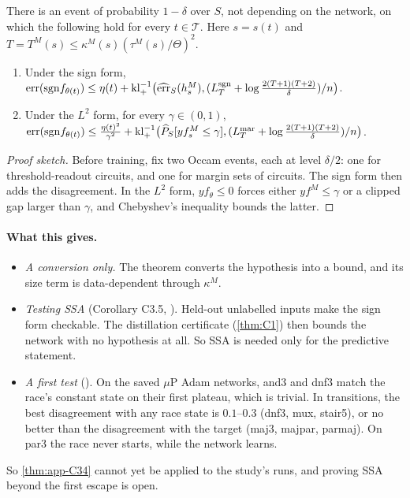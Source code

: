 \begin{theorem}\label{thm:app-C34}
\quad There is an event of probability $1-\delta$ over $S$, not depending on the network, on which the following hold for every $t\in\mathcal T$. Here $s=s(t)$ and $T=T^M(s)\le\kappa^M(s)(\tau^M(s)/\Theta)^2$.
\begin{enumerate}[label=(\arabic*),nosep]
\item Under the sign form, $\mathrm{err}(\mathrm{sgn}f_{\theta(t)})\le\eta(t)+\mathrm{kl}^{-1}_+\big(\widehat{\mathrm{err}}_S(h^M_s),(L^{\rm sgn}_T+\log\frac{2(T+1)(T+2)}\delta)/n\big)$.
\item Under the $L^2$ form, for every $\gamma\in(0,1)$, $\mathrm{err}(\mathrm{sgn}f_{\theta(t)})\le\frac{\eta(t)^2}{\gamma^2}+\mathrm{kl}^{-1}_+\big(\widehat P_S[yf^M_s\le\gamma],(L^{\rm mar}_T+\log\frac{2(T+1)(T+2)}\delta)/n\big)$.
\end{enumerate}
\end{theorem}
\begin{proof}[Proof sketch]
Before training, fix two Occam events, each at level $\delta/2$: one for threshold-readout circuits, and one for margin sets of circuits. The sign form then adds the disagreement. In the $L^2$ form, $yf_\theta\le0$ forces either $yf^M\le\gamma$ or a clipped gap larger than $\gamma$, and Chebyshev's inequality bounds the latter.
\end{proof}

\paragraph{What this gives.}
\begin{itemize}[nosep]
\item \emph{A conversion only.} The theorem converts the hypothesis into a bound, and its size term is data-dependent through $\kappa^M$.
\item \emph{Testing SSA} (Corollary C3.5, ). Held-out unlabelled inputs make the sign form checkable. The distillation certificate (\cref{thm:C1}) then bounds the network with no hypothesis at all. So SSA is needed only for the predictive statement.
\item \emph{A first test} (). On the saved $\mu$P Adam networks, and3 and dnf3 match the race's constant state on their first plateau, which is trivial. In transitions, the best disagreement with any race state is $0.1$--$0.3$ (dnf3, mux, stair5), or no better than the disagreement with the target (maj3, majpar, parmaj). On par3 the race never starts, while the network learns.
\end{itemize}
So \cref{thm:app-C34} cannot yet be applied to the study's runs, and proving SSA beyond the first escape is open.
